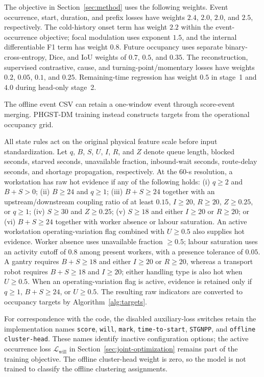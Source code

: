 \documentclass[a4paper,fleqn]{cas-dc}
\begin{document}
The objective in Section~\ref{sec:method} uses the following weights. Event occurrence, start, duration, and prefix losses have weights $2.4$, $2.0$, $2.0$, and $2.5$, respectively. The cold-history onset term has weight $2.2$ within the event-occurrence objective; focal modulation uses exponent $1.5$, and the internal differentiable F1 term has weight $0.8$. Future occupancy uses separate binary-cross-entropy, Dice, and IoU weights of $0.7$, $0.5$, and $0.35$. The reconstruction, supervised contrastive, cause, and turning-point/momentary losses have weights $0.2$, $0.05$, $0.1$, and $0.25$. Remaining-time regression has weight $0.5$ in stage~1 and $4.0$ during head-only stage~2.

The offline event CSV can retain a one-window event through score-event merging. PHGST-DM training instead constructs targets from the operational occupancy grid.

All state rules act on the original physical feature scale before input standardization. Let $q$, $B$, $S$, $U$, $I$, $R$, and $Z$ denote queue length, blocked seconds, starved seconds, unavailable fraction, inbound-wait seconds, route-delay seconds, and shortage propagation, respectively. At the 60-s resolution, a workstation has raw hot evidence if any of the following holds: (i) $q\geq2$ and $B+S>0$; (ii) $B\geq24$ and $q\geq1$; (iii) $B+S\geq24$ together with an upstream/downstream coupling ratio of at least $0.15$, $I\geq20$, $R\geq20$, $Z\geq0.25$, or $q\geq1$; (iv) $S\geq30$ and $Z\geq0.25$; (v) $S\geq18$ and either $I\geq20$ or $R\geq20$; or (vi) $B+S\geq24$ together with worker absence or labour saturation. An active workstation operating-variation flag combined with $U\geq0.5$ also supplies hot evidence. Worker absence uses unavailable fraction $\geq0.5$; labour saturation uses an activity cutoff of $0.8$ among present workers, with a presence tolerance of $0.05$. A gantry requires $B+S\geq18$ and either $I\geq20$ or $R\geq20$, whereas a transport robot requires $B+S\geq18$ and $I\geq20$; either handling type is also hot when $U\geq0.5$. When an operating-variation flag is active, evidence is retained only if $q\geq1$, $B+S\geq24$, or $U\geq0.5$. The resulting raw indicators are converted to occupancy targets by Algorithm~\ref{alg:targets}.

For correspondence with the code, the disabled auxiliary-loss switches retain the implementation names \texttt{score}, \texttt{will}, \texttt{mark}, \texttt{time-to-start}, \texttt{STGNPP}, and \texttt{offline cluster-head}. These names identify inactive configuration options; the active occurrence loss $\mathcal{L}_{\mathrm{will}}$ in Section~\ref{sec:joint-optimization} remains part of the training objective. The offline cluster-head weight is zero, so the model is not trained to classify the offline clustering assignments.
\end{document}
